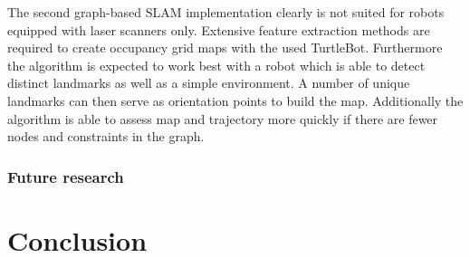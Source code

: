 \documentclass{ba-kecs}
\begin{document}
The second graph-based SLAM implementation \cite{Thrun} clearly is not suited for robots equipped with laser scanners only. Extensive feature extraction methods are required to create occupancy grid maps with the used TurtleBot. Furthermore the algorithm is expected to work best with a robot which is able to detect distinct landmarks as well as a simple environment. A number of unique landmarks can then serve as orientation points to build the map. Additionally the algorithm is able to assess map and trajectory more quickly if there are fewer nodes and constraints in the graph.

\subsubsection{Future research}

\section{Conclusion}
\label{sec:conc}

\nocite{*}
\onecolumn
\appendix
\end{document}
